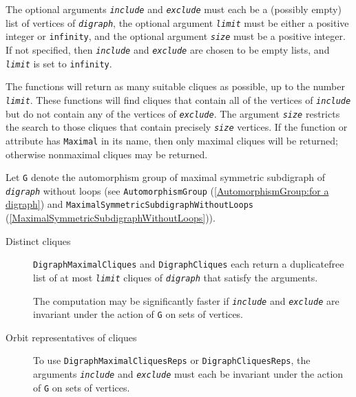 \documentclass[a4paper,11pt]{report}
\begin{document}
{{{ The optional arguments \mbox{\texttt{\mdseries\slshape include}} and \mbox{\texttt{\mdseries\slshape exclude}} must each be a (possibly empty) list of vertices of \mbox{\texttt{\mdseries\slshape digraph}}, the optional argument \mbox{\texttt{\mdseries\slshape limit}} must be either a positive integer or \texttt{infinity}, and the optional argument \mbox{\texttt{\mdseries\slshape size}} must be a positive integer. If not specified, then \mbox{\texttt{\mdseries\slshape include}} and \mbox{\texttt{\mdseries\slshape exclude}} are chosen to be empty lists, and \mbox{\texttt{\mdseries\slshape limit}} is set to \texttt{infinity}. 

 The functions will return as many suitable cliques as possible, up to the
number \mbox{\texttt{\mdseries\slshape limit}}. These functions will find cliques that contain all of the vertices of \mbox{\texttt{\mdseries\slshape include}} but do not contain any of the vertices of \mbox{\texttt{\mdseries\slshape exclude}}. The argument \mbox{\texttt{\mdseries\slshape size}} restricts the search to those cliques that contain precisely \mbox{\texttt{\mdseries\slshape size}} vertices. If the function or attribute has \texttt{Maximal} in its name, then only maximal cliques will be returned; otherwise
non\texttt{}maximal cliques may be returned. 

 Let \texttt{G} denote the automorphism group of maximal symmetric subdigraph of \mbox{\texttt{\mdseries\slshape digraph}} without loops (see \texttt{AutomorphismGroup} (\ref{AutomorphismGroup:for a digraph}) and \texttt{MaximalSymmetricSubdigraphWithoutLoops} (\ref{MaximalSymmetricSubdigraphWithoutLoops})). 
\begin{description}
\item[{Distinct cliques}]  \texttt{DigraphMaximalCliques} and \texttt{DigraphCliques} each return a duplicate\texttt{}free list of at most \mbox{\texttt{\mdseries\slshape limit}} cliques of \mbox{\texttt{\mdseries\slshape digraph}} that satisfy the arguments.

 The computation may be significantly faster if \mbox{\texttt{\mdseries\slshape include}} and \mbox{\texttt{\mdseries\slshape exclude}} are invariant under the action of \texttt{G} on sets of vertices. 
\item[{Orbit representatives of cliques}]  To use \texttt{DigraphMaximalCliquesReps} or \texttt{DigraphCliquesReps}, the arguments \mbox{\texttt{\mdseries\slshape include}} and \mbox{\texttt{\mdseries\slshape exclude}} must each be invariant under the action of \texttt{G} on sets of vertices.


\end{description}}}}
\end{document}
